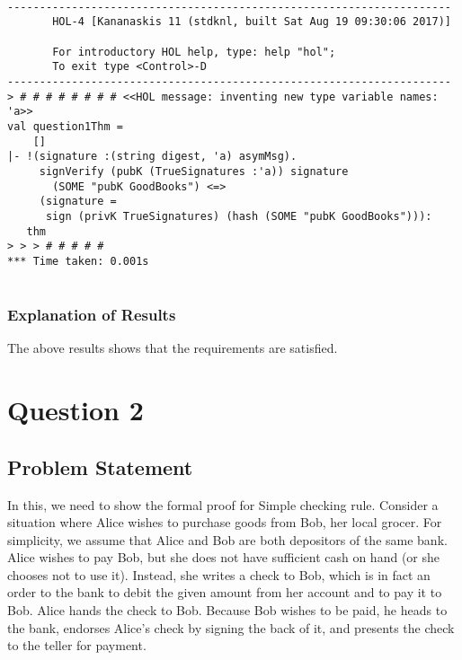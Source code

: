 \documentclass{report}
\begin{document}
\setcounter{sessioncount}{0}
\begin{session}
  \begin{scriptsize}
\begin{verbatim}

---------------------------------------------------------------------
       HOL-4 [Kananaskis 11 (stdknl, built Sat Aug 19 09:30:06 2017)]

       For introductory HOL help, type: help "hol";
       To exit type <Control>-D
---------------------------------------------------------------------
> # # # # # # # # <<HOL message: inventing new type variable names: 'a>>
val question1Thm =
    []
|- !(signature :(string digest, 'a) asymMsg).
     signVerify (pubK (TrueSignatures :'a)) signature
       (SOME "pubK GoodBooks") <=>
     (signature =
      sign (privK TrueSignatures) (hash (SOME "pubK GoodBooks"))):
   thm
> > > # # # # # 
*** Time taken: 0.001s
 
\end{verbatim}
  \end{scriptsize}
\end{session}

\subsection{Explanation of Results}
\label{sec:explanation-results-1}
The above results shows that the requirements are satisfied.


 \chapter{Question 2}
 \label{cha:ques2}
  
 \section{Problem Statement}
 \label{sec:problem-statement-2}

 In this, we need to show the formal proof for Simple checking rule.
 Consider a situation where Alice wishes to purchase goods from Bob,
 her local grocer.  For simplicity, we assume that Alice and Bob are
 both depositors of the same bank. Alice wishes to pay Bob, but she
 does not have sufficient cash on hand (or she chooses not to use
 it). Instead, she writes a check to Bob, which is in fact an order to
 the bank to debit the given amount from her account and to pay it to
 Bob. Alice hands the check to Bob. Because Bob wishes to be paid, he
 heads to the bank, endorses Alice’s check by signing the back of it,
 and presents the check to the teller for payment.
\end{document}
